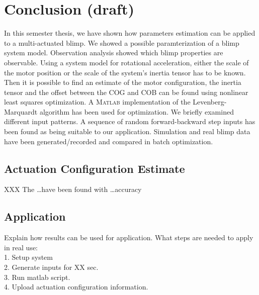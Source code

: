 \chapter{Conclusion (draft)}
\label{chap:conclusion}

In this semester thesis, we have shown how parameters estimation can be applied to a multi-actuated blimp.
We showed a possible paramterization of a blimp system model.
Observation analysis showed which blimp properties are observable.
Using a system model for rotational acceleration, either the scale of the motor position or the scale of the system's inertia tensor has to be known.
Then it is possible to find an estimate of the motor configuration, the inertia tensor and the offset between the COG and COB can be found using nonlinear least squares optimization.
A \textsc{Matlab} implementation of the Levenberg-Marquardt algorithm has been used for optimization.
We briefly examined different input patterns.
A sequence of random forward-backward step inputs has been found as being suitable to our application.
Simulation and real blimp data have been generated/recorded and compared in batch optimization.

\section{Actuation Configuration Estimate}
XXX
The \dots have been found with \dots accuracy


\section{Application}
Explain how results can be used for application.
What steps are needed to apply in real use: \\
1. Setup system \\
2. Generate inputs for XX sec. \\
3. Run matlab script. \\
4. Upload actuation configuration information.
